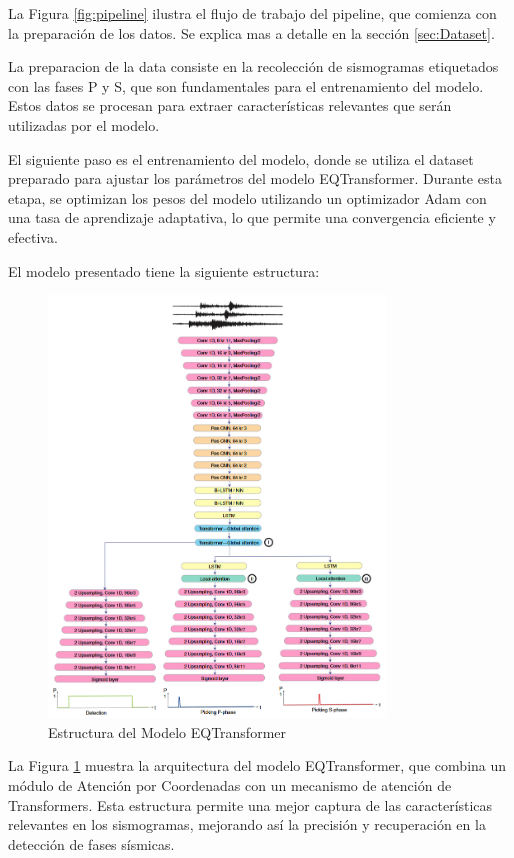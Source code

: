 La Figura \ref{fig:pipeline} ilustra el flujo de trabajo del pipeline, que comienza con la preparación de los datos. Se explica mas a detalle en la sección \ref{sec:Dataset}.

La preparacion de la data consiste en la recolección de sismogramas etiquetados con las fases P y S, que son fundamentales para el entrenamiento del modelo. Estos datos se procesan para extraer características relevantes que serán utilizadas por el modelo.

El siguiente paso es el entrenamiento del modelo, donde se utiliza el dataset preparado para ajustar los parámetros del modelo EQTransformer. Durante esta etapa, se optimizan los pesos del modelo utilizando un optimizador Adam con una tasa de aprendizaje adaptativa, lo que permite una convergencia eficiente y efectiva.

El modelo presentado tiene la siguiente estructura:

\begin{figure}
\centering
\includegraphics[width=0.8\textwidth]{figures/transformer.png}
\caption{Estructura del Modelo EQTransformer}
\label{fig:eqtransformer}
\end{figure}

La Figura \ref{fig:eqtransformer} muestra la arquitectura del modelo EQTransformer, que combina un módulo de Atención por Coordenadas con un mecanismo de atención de Transformers. Esta estructura permite una mejor captura de las características relevantes en los sismogramas, mejorando así la precisión y recuperación en la detección de fases sísmicas.



